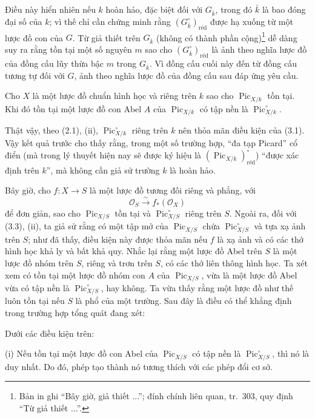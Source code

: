 Điều này hiển nhiên nếu $k$ hoàn hảo, đặc biệt đối với $G_{\bar k}$, trong đó
$\bar k$ là bao đóng đại số của $k$; vì thế chỉ cần chứng minh rằng
$(G_{\bar k}^\circ)_{\mathrm{réd}}$ được hạ xuống từ một lược đồ con của $G$.
Từ giả thiết trên $G_{\bar k}$ (không có thành phần cộng)\footnote{Bản in ghi
``Bây giờ, giả thiết ...''; đính chính liên quan, tr.~303, quy định ``Từ giả
thiết ...''.} dễ dàng suy ra rằng tồn tại một số nguyên $m$ sao cho
$(G_{\bar k}^\circ)_{\mathrm{réd}}$ là ảnh theo nghĩa lược đồ của đồng cấu lũy
thừa bậc $m$ trong $G_{\bar k}$. Vì đồng cấu cuối này đến từ đồng cấu tương tự
đối với $G$, ảnh theo nghĩa lược đồ của đồng cấu sau đáp ứng yêu cầu.

 Cho $X$ là một lược đồ chuẩn hình học và riêng trên $k$ sao cho
$\operatorname{Pic}_{X/k}$ tồn tại. Khi đó tồn tại một lược đồ con Abel $A$
của $\operatorname{Pic}_{X/k}$ có tập nền là
$\operatorname{Pic}_{X/k}^\circ$.

Thật vậy, theo (2.1), (ii), $\operatorname{Pic}_{X/k}^\circ$ riêng trên $k$
nên thỏa mãn điều kiện của (3.1).
Vậy kết quả trước cho thấy rằng, trong một số trường hợp, ``đa tạp Picard''
cổ điển (mà trong lý thuyết hiện nay sẽ được ký hiệu là
$(\operatorname{Pic}_{X/k})_{\mathrm{réd}}^\circ$) ``được xác định trên
$k$'', mà không cần giả sử trường $k$ là hoàn hảo.

Bây giờ, cho $f:X\longrightarrow S$ là một lược đồ tương đối riêng và phẳng,
với
\[
\mathcal O_S\xrightarrow{\sim}f_*(\mathcal O_X)
\]
để đơn giản, sao cho $\operatorname{Pic}_{X/S}$ tồn tại và
$\operatorname{Pic}_{X/S}^\circ$ riêng trên $S$. Ngoài ra, đối với (3.3),
(ii), ta giả sử rằng có một tập mở của $\operatorname{Pic}_{X/S}$ chứa
$\operatorname{Pic}_{X/S}^\circ$ và tựa xạ ảnh trên $S$; như đã thấy, điều
kiện này được thỏa mãn nếu $f$ là xạ ảnh và có các thớ hình học khả ly và bất khả
quy. Nhắc lại rằng một lược đồ Abel trên $S$ là một lược đồ nhóm trên $S$,
riêng và trơn trên $S$, có các thớ liên thông hình học. Ta xét xem có tồn tại
một lược đồ nhóm con $A$ của $\operatorname{Pic}_{X/S}$, vừa là một lược đồ
Abel vừa có tập nền là $\operatorname{Pic}_{X/S}^\circ$, hay không. Ta vừa
thấy rằng một lược đồ như thế luôn tồn tại nếu $S$ là phổ của một trường. Sau
đây là điều có thể khẳng định trong trường hợp tổng quát đang xét:

 Dưới các điều kiện trên:

\noindent(i) Nếu tồn tại một lược đồ con Abel của
$\operatorname{Pic}_{X/S}$ có tập nền là
$\operatorname{Pic}_{X/S}^\circ$, thì nó là duy nhất. Do đó, phép tạo thành
nó tương thích với các phép đổi cơ sở.

